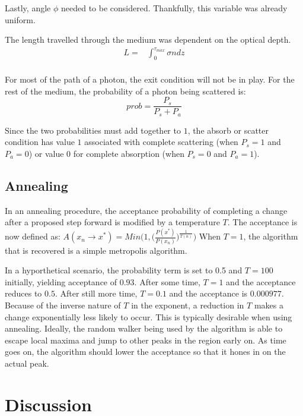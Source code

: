 \documentclass[twocolumn]{article}
\begin{document}
Lastly, angle $\phi$ needed to be considered. Thankfully, this variable was already uniform.

The length travelled through the medium was dependent on the optical depth.
\begin{equation}
\begin{split}
L =& \int_{0}^{\tau_{max}}\sigma n dz \\
\end{split}
\end{equation}

For most of the path of a photon, the exit condition will not be in play. For the rest of the medium, the probability of a photon being scattered is:
\begin{equation}
prob = \frac{P_s}{P_s + P_a}
\end{equation}

Since the two probabilities must add together to $1$, the absorb or scatter condition has value $1$ associated with complete scattering (when $P_s = 1$ and $P_a=0$) or value $0$ for complete absorption (when $P_s = 0$ and $P_a=1$).

\subsection{Annealing}
In an annealing procedure, the acceptance probability of completing a change after a proposed step forward is modified by a temperature $T$. The acceptance is now defined as:
$A(x_n \to x^*) = Min \Bigg( 1, \Big( \frac{P(x^*)}{P(x_n)}\Big) ^{ \frac{1}{T(n)} } \Bigg)$
When $T=1$, the algorithm that is recovered is a simple metropolis algorithm. 

In a hyporthetical scenario, the probability term is set to 0.5 and $T=100$ initially, yielding acceptance of $0.93$. After some time, $T=1$ and the acceptance reduces to $0.5$. After still more time, $T=0.1$ and the acceptance is $0.000977$. Because of the inverse nature of $T$ in the exponent, a reduction in $T$ makes a change exponentially less likely to occur. This is typically desirable when using annealing. Ideally, the random walker being used by the algorithm is able to escape local maxima and jump to other peaks in the region early on. As time goes on, the algorithm should lower the acceptance so that it hones in on the actual peak.


\section{Discussion}
\end{document}
